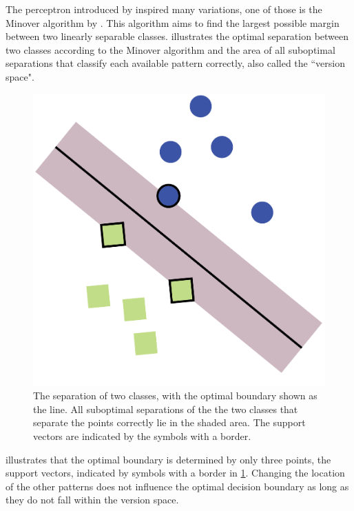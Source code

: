 The perceptron introduced by \citeauthor{rosenblatt1958perceptron} inspired many variations, one of those is the Minover algorithm by \citeauthor{krauth1987learning}. This algorithm aims to find the largest possible margin between two linearly separable classes.  illustrates the optimal separation between two classes according to the Minover algorithm and the area of all suboptimal separations that classify each available pattern correctly, also called the ``version space". 

\begin{figure}[H]
	\centering
	\includegraphics[width=0.9\columnwidth]{./img/optimalboundary-01}
	\caption{The separation of two classes, with the optimal boundary shown as the line. All suboptimal separations of the the two classes that separate the points correctly lie in the shaded area. The support vectors are indicated by the symbols with a border.}
	\label{fig:1:optimalSolution}
\end{figure}

 illustrates that the optimal boundary is determined by only three points, the support vectors, indicated by symbols with a border in \cref{fig:1:optimalSolution}. Changing the location of the other patterns does not influence the optimal decision boundary as long as they do not fall within the version space.

